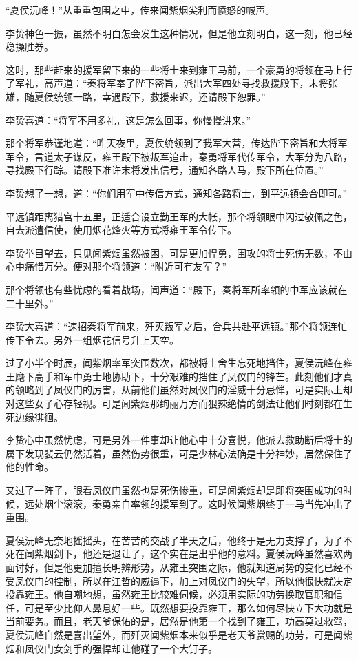 “夏侯沅峰！”从重重包围之中，传来闻紫烟尖利而愤怒的喊声。

李贽神色一振，虽然不明白怎会发生这种情况，但是他立刻明白，这一刻，他已经稳操胜券。

这时，那些赶来的援军留下来的一些将士来到雍王马前，一个豪勇的将领在马上行了军礼，高声道：“秦将军奉了陛下密旨，派出大军四处寻找救援殿下，末将张雄，随夏侯统领一路，幸遇殿下，救援来迟，还请殿下恕罪。”

李贽喜道：“将军不用多礼，这是怎么回事，你慢慢讲来。”

那个将军恭谨地道：“昨天夜里，夏侯统领到了我军大营，传达陛下密旨和大将军军令，言道太子谋反，雍王殿下被叛军追击，秦勇将军代传军令，大军分为八路，寻找殿下行踪。请殿下准许末将发出信号，通知各路人马，殿下所在位置。”

李贽想了一想，道：“你们用军中传信方式，通知各路将士，到平远镇会合即可。”

平远镇距离猎宫十五里，正适合设立勤王军的大帐，那个将领眼中闪过敬佩之色，自去派遣信使，使用烟花烽火等方式将雍王军令传下。

李贽举目望去，只见闻紫烟虽然被困，可是更加悍勇，围攻的将士死伤无数，不由心中痛惜万分。便对那个将领道：“附近可有友军？”

那个将领也有些忧虑的看着战场，闻声道：“殿下，秦将军所率领的中军应该就在二十里外。”

李贽大喜道：“速招秦将军前来，歼灭叛军之后，合兵共赴平远镇。”那个将领连忙传下令去。另外一组烟花信号升上天空。

过了小半个时辰，闻紫烟率军突围数次，都被将士舍生忘死地挡住，夏侯沅峰在雍王麾下高手和军中勇士地协助下，十分艰难的挡住了凤仪门的锋芒。此刻他们才真的领略到了凤仪门的厉害，从前他们虽然对凤仪门的淫威十分忌惮，可是实际上却对这些女子心存轻视。可是闻紫烟那绚丽万方而狠辣绝情的剑法让他们时刻都在生死边缘徘徊。

李贽心中虽然忧虑，可是另外一件事却让他心中十分喜悦，他派去救助断后将士的属下发现裴云仍然活着，虽然伤势很重，可是少林心法确是十分神妙，居然保住了他的性命。

又过了一阵子，眼看凤仪门虽然也是死伤惨重，可是闻紫烟却是即将突围成功的时候，远处烟尘滚滚，秦勇亲自率领的援军到了。这时候闻紫烟终于一马当先冲出了重围。

夏侯沅峰无奈地摇摇头，在苦苦的交战了半天之后，他终于是无力支撑了，为了不死在闻紫烟剑下，他还是退让了，这个实在是出乎他的意料。夏侯沅峰虽然喜欢两面讨好，但是他更加擅长明辨形势，从雍王突围之际，他就知道局势的变化已经不受凤仪门的控制，所以在江哲的威逼下，加上对凤仪门的失望，所以他很快就决定投靠雍王。他自嘲地想，虽然雍王比较难伺候，必须用实际的功劳换取官职和信任，可是至少比仰人鼻息好一些。既然想要投靠雍王，那么如何尽快立下大功就是当前要务。而且，老天爷保佑的是，居然是他第一个找到了雍王，功高莫过救驾，夏侯沅峰自然是喜出望外，而歼灭闻紫烟本来似乎是老天爷赏赐的功劳，可是闻紫烟和凤仪门女剑手的强悍却让他碰了一个大钉子。


